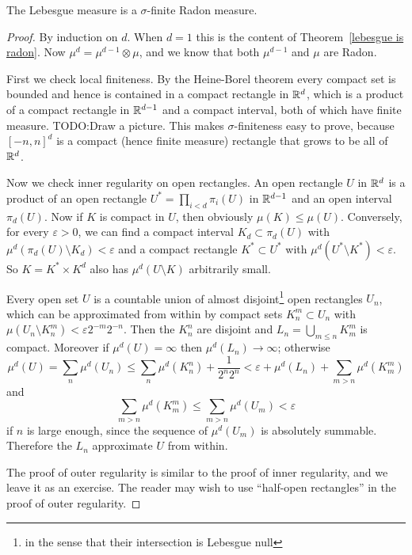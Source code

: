 \begin{theorem}\label{lebesgue is radon 2}
The Lebesgue measure is a $\sigma$-finite Radon measure.
\end{theorem}
\begin{proof}
By induction on $d$. When $d = 1$ this is the content of Theorem~\ref{lebesgue is radon}.
Now $\mu^{d} = \mu^{d-1} \otimes \mu$, and we know that both $\mu^{d-1}$ and $\mu$ are Radon.

First we check local finiteness. By the Heine-Borel theorem every compact set is bounded and hence is contained in a compact rectangle in $\mathbb{R}^{d}$, which is a product of a compact rectangle in $\mathbb{R}^{d-1}$ and a compact interval, both of which have finite measure.
TODO:Draw a picture.
This makes $\sigma$-finiteness easy to prove, because ${[-n, n]}^{d}$ is a compact (hence finite measure) rectangle that grows to be all of $\mathbb{R}^{d}$.

Now we check inner regularity on open rectangles.
An open rectangle $U$ in $\mathbb{R}^{d}$ is a product of an open rectangle $U^{*} = \prod_{i<d} \pi_{i}(U)$ in $\mathbb{R}^{d-1}$ and an open interval $\pi_{d}(U)$.
Now if $K$ is compact in $U$, then obviously $\mu(K) \leq \mu(U)$.
Conversely, for every $\varepsilon > 0$, we can find a compact interval $K_{d} \subset \pi_{d}(U)$ with $\mu^{d}(\pi_{d}(U) \setminus K_{d}) < \varepsilon$ and a compact rectangle $K^{*} \subset U^{*}$ with $\mu^{d}(U^{*} \setminus K^{*}) < \varepsilon$. So $K = K^{*} \times K^{d}$ also has $\mu^{d}(U \setminus K)$ arbitrarily small.

Every open set $U$ is a countable union of almost disjoint\footnote{in the sense that their intersection is Lebesgue null} open rectangles $U_{n}$, which can be approximated from within by compact sets $K_{n}^{m} \subset U_{n}$ with $\mu(U_{n} \setminus K_{n}^{m}) < \varepsilon 2^{-m}2^{-n}$. Then the $K_{n}^{n}$ are disjoint and $L_{n} = \bigcup_{m \leq n} K_{m}^{m}$ is compact.
Moreover if $\mu^{d}(U) = \infty$ then $\mu^{d}(L_{n}) \to \infty$; otherwise
\[\mu^{d}(U) = \sum_{n} \mu^{d}(U_{n}) \leq \sum_{n} \mu^{d}(K_{n}^{n}) + \frac{1}{2^{n}2^{n}} < \varepsilon + \mu^{d}(L_{n}) + \sum_{m > n} \mu^{d}(K_{m}^{m})\]
and
\[\sum_{m > n} \mu^{d}(K_{m}^{m}) \leq \sum_{m > n} \mu^{d}(U_{m}) < \varepsilon\]
if $n$ is large enough, since the sequence of $\mu^{d}(U_{m})$ is absolutely summable.
Therefore the $L_{n}$ approximate $U$ from within.

The proof of outer regularity is similar to the proof of inner regularity, and we leave it as an exercise.
The reader may wish to use ``half-open rectangles'' in the proof of outer regularity.
\end{proof}

